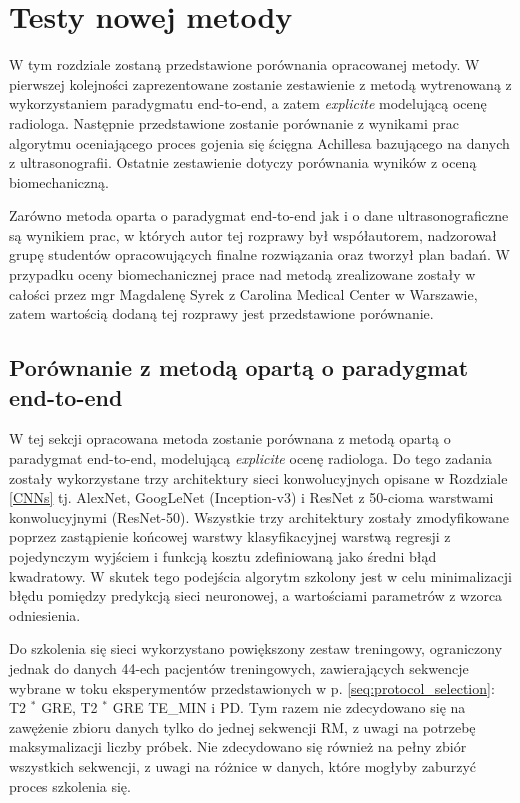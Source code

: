 \chapter{Testy nowej metody}

W tym rozdziale zostaną przedstawione porównania opracowanej metody. \linebreak W pierwszej kolejności zaprezentowane zostanie zestawienie z metodą wytrenowaną z wykorzystaniem paradygmatu end-to-end, a zatem \textit{explicite} modelującą ocenę radiologa. Następnie przedstawione zostanie porównanie z wynikami prac algorytmu oceniającego proces gojenia się ścięgna Achillesa bazującego na danych z ultrasonografii. Ostatnie zestawienie dotyczy porównania wyników z oceną biomechaniczną.

Zarówno metoda oparta o paradygmat end-to-end jak i o dane ultrasonograficzne są wynikiem prac, w których autor tej rozprawy był współautorem, nadzorował grupę studentów opracowujących finalne rozwiązania oraz tworzył plan badań. \linebreak W przypadku oceny biomechanicznej prace nad metodą zrealizowane zostały w całości przez mgr Magdalenę Syrek z Carolina Medical Center w Warszawie, zatem wartością dodaną tej rozprawy jest przedstawione porównanie.   

\section{Porównanie z metodą opartą o paradygmat end-to-end}
\label{seq:end-to-end}
W tej sekcji opracowana metoda zostanie porównana z metodą opartą o paradygmat end-to-end, modelującą \textit{explicite} ocenę radiologa. Do tego zadania zostały wykorzystane trzy architektury sieci konwolucyjnych opisane w Rozdziale \ref{CNNs} tj. AlexNet, GoogLeNet (Inception-v3) i ResNet z 50-cioma warstwami konwolucyjnymi (ResNet-50). Wszystkie trzy architektury zostały zmodyfikowane poprzez zastąpienie końcowej warstwy klasyfikacyjnej warstwą regresji z pojedynczym wyjściem \linebreak i funkcją kosztu zdefiniowaną jako średni błąd kwadratowy. W skutek tego podejścia algorytm szkolony jest w celu minimalizacji błędu pomiędzy predykcją sieci neuronowej, a wartościami parametrów z wzorca odniesienia. 

Do szkolenia się sieci wykorzystano powiększony zestaw treningowy, ograniczony jednak do danych 44-ech pacjentów treningowych, zawierających sekwencje wybrane w toku eksperymentów przedstawionych w p. \ref{seq:protocol_selection}: T2 $^\ast$ GRE, T2 $^\ast$ GRE TE\_MIN i PD. Tym razem nie zdecydowano się na zawężenie zbioru danych tylko do jednej sekwencji RM, z uwagi na potrzebę maksymalizacji liczby próbek. Nie zdecydowano się również na pełny zbiór wszystkich sekwencji, z uwagi na różnice w danych, które mogłyby zaburzyć proces szkolenia się. 

